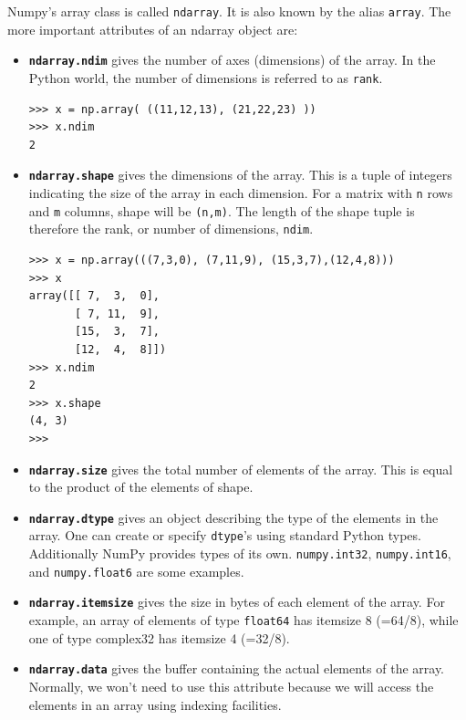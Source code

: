 \documentclass[12pt]{article}
\begin{document}
Numpy's array class is called \texttt{ndarray}. It is also known by the alias \texttt{array}. The more important attributes of an ndarray object are:
\begin{itemize}
\item \textbf{\texttt{ndarray.ndim}} gives
the number of axes (dimensions) of the array. In the Python world, the number of dimensions is referred to as  \texttt{rank}.
\footnotesize
\begin{Verbatim}[frame=single]
>>> x = np.array( ((11,12,13), (21,22,23) ))
>>> x.ndim
2
\end{Verbatim}
\normalsize
\item \textbf{\texttt{ndarray.shape}} gives
the dimensions of the array. This is a tuple of integers indicating the size of the array in each dimension. For a matrix with \texttt{n} rows and \texttt{m} columns, shape will be \texttt{(n,m)}. The length of the shape tuple is therefore the rank, or number of dimensions, \texttt{ndim}.
\footnotesize
\begin{Verbatim}[frame=single]
>>> x = np.array(((7,3,0), (7,11,9), (15,3,7),(12,4,8)))
>>> x
array([[ 7,  3,  0],
       [ 7, 11,  9],
       [15,  3,  7],
       [12,  4,  8]])
>>> x.ndim
2
>>> x.shape
(4, 3)
>>> 
\end{Verbatim}
\normalsize
\item \textbf{\texttt{ndarray.size}} gives
the total number of elements of the array. This is equal to the product of the elements of shape.
\item \textbf{\texttt{ndarray.dtype}} gives
an object describing the type of the elements in the array. One can create or specify \texttt{dtype}'s using standard Python types. Additionally NumPy provides types of its own. \texttt{numpy.int32}, \texttt{numpy.int16}, and \texttt{numpy.float6} are some examples.
\item \textbf{\texttt{ndarray.itemsize}} gives
the size in bytes of each element of the array. For example, an array of elements of type \texttt{float64} has itemsize 8 (=64/8), while one of type complex32 has itemsize 4 (=32/8). 
\item \textbf{\texttt{ndarray.data}} gives
the buffer containing the actual elements of the array. Normally, we won't need to use this attribute because we will access the elements in an array using indexing facilities.
\end{itemize}


\end{document}
